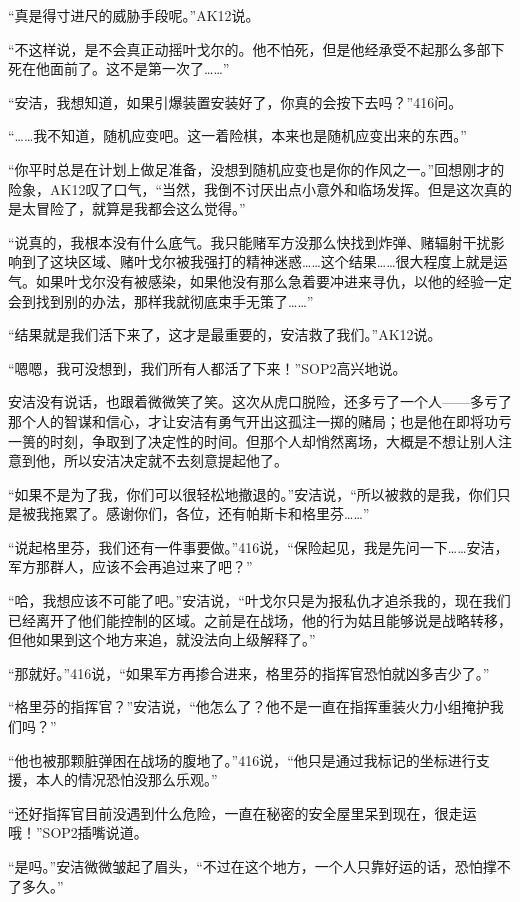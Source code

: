 “真是得寸进尺的威胁手段呢。”AK12说。

“不这样说，是不会真正动摇叶戈尔的。他不怕死，但是他经承受不起那么多部下死在他面前了。这不是第一次了……”

“安洁，我想知道，如果引爆装置安装好了，你真的会按下去吗？”416问。

“……我不知道，随机应变吧。这一着险棋，本来也是随机应变出来的东西。”

“你平时总是在计划上做足准备，没想到随机应变也是你的作风之一。”回想刚才的险象，AK12叹了口气，“当然，我倒不讨厌出点小意外和临场发挥。但是这次真的是太冒险了，就算是我都会这么觉得。”

“说真的，我根本没有什么底气。我只能赌军方没那么快找到炸弹、赌辐射干扰影响到了这块区域、赌叶戈尔被我强打的精神迷惑……这个结果……很大程度上就是运气。如果叶戈尔没有被感染，如果他没有那么急着要冲进来寻仇，以他的经验一定会到找到别的办法，那样我就彻底束手无策了……”

“结果就是我们活下来了，这才是最重要的，安洁救了我们。”AK12说。

“嗯嗯，我可没想到，我们所有人都活了下来！”SOP2高兴地说。

安洁没有说话，也跟着微微笑了笑。这次从虎口脱险，还多亏了一个人——多亏了那个人的智谋和信心，才让安洁有勇气开出这孤注一掷的赌局；也是他在即将功亏一篑的时刻，争取到了决定性的时间。但那个人却悄然离场，大概是不想让别人注意到他，所以安洁决定就不去刻意提起他了。

“如果不是为了我，你们可以很轻松地撤退的。”安洁说，“所以被救的是我，你们只是被我拖累了。感谢你们，各位，还有帕斯卡和格里芬……”

“说起格里芬，我们还有一件事要做。”416说，“保险起见，我是先问一下……安洁，军方那群人，应该不会再追过来了吧？” 

“哈，我想应该不可能了吧。”安洁说，“叶戈尔只是为报私仇才追杀我的，现在我们已经离开了他们能控制的区域。之前是在战场，他的行为姑且能够说是战略转移，但他如果到这个地方来追，就没法向上级解释了。”

“那就好。”416说，“如果军方再掺合进来，格里芬的指挥官恐怕就凶多吉少了。”

“格里芬的指挥官？”安洁说，“他怎么了？他不是一直在指挥重装火力小组掩护我们吗？”

“他也被那颗脏弹困在战场的腹地了。”416说，“他只是通过我标记的坐标进行支援，本人的情况恐怕没那么乐观。”

“还好指挥官目前没遇到什么危险，一直在秘密的安全屋里呆到现在，很走运哦！”SOP2插嘴说道。

“是吗。”安洁微微皱起了眉头，“不过在这个地方，一个人只靠好运的话，恐怕撑不了多久。”

